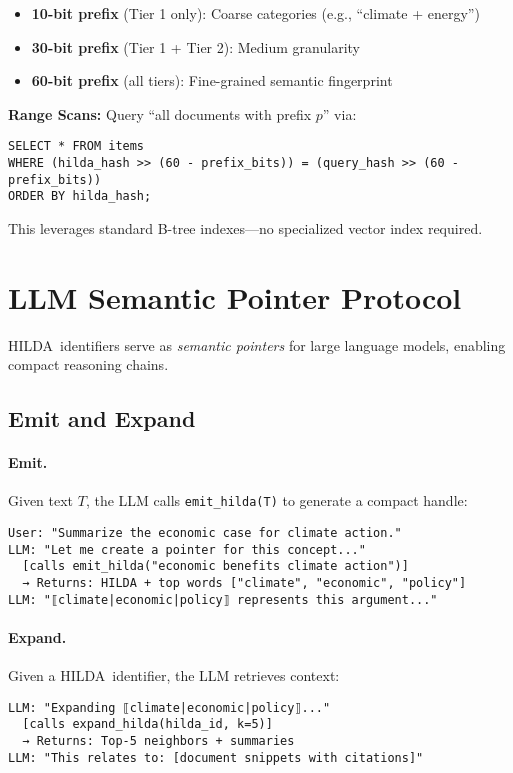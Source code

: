 \documentclass[11pt]{article}
\newcommand{\hilda}{\textsc{HILDA}}
\begin{document}
\begin{itemize}
  \item \textbf{10-bit prefix} (Tier 1 only): Coarse categories (e.g., ``climate + energy'')
  \item \textbf{30-bit prefix} (Tier 1 + Tier 2): Medium granularity
  \item \textbf{60-bit prefix} (all tiers): Fine-grained semantic fingerprint
\end{itemize}

\textbf{Range Scans:} Query ``all documents with prefix $p$'' via:
\begin{verbatim}
SELECT * FROM items 
WHERE (hilda_hash >> (60 - prefix_bits)) = (query_hash >> (60 - prefix_bits))
ORDER BY hilda_hash;
\end{verbatim}

This leverages standard B-tree indexes---no specialized vector index required.

\section{LLM Semantic Pointer Protocol}

\hilda\ identifiers serve as \emph{semantic pointers} for large language models, enabling compact reasoning chains.

\subsection{Emit and Expand}

\paragraph{Emit.} Given text $T$, the LLM calls \texttt{emit\_hilda(T)} to generate a compact handle:
\begin{verbatim}
User: "Summarize the economic case for climate action."
LLM: "Let me create a pointer for this concept..."
  [calls emit_hilda("economic benefits climate action")]
  → Returns: HILDA + top words ["climate", "economic", "policy"]
LLM: "⟦climate|economic|policy⟧ represents this argument..."
\end{verbatim}

\paragraph{Expand.} Given a \hilda\ identifier, the LLM retrieves context:
\begin{verbatim}
LLM: "Expanding ⟦climate|economic|policy⟧..."
  [calls expand_hilda(hilda_id, k=5)]
  → Returns: Top-5 neighbors + summaries
LLM: "This relates to: [document snippets with citations]"
\end{verbatim}
\end{document}
